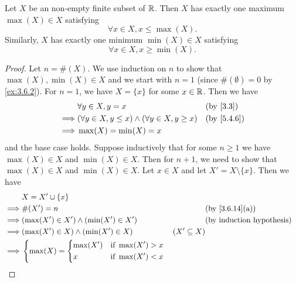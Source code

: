 \begin{ac}\label{ac:5.4.1}
  Let \(X\) be an non-empty finite subset of \(\mathbb{R}\).
  Then \(X\) has exactly one maximum \(\max(X) \in X\) satisfying
  \[
    \forall x \in X, x \leq \max(X).
  \]
  Similarly, \(X\) has exactly one minimum \(\min(X) \in X\) satisfying
  \[
    \forall x \in X, x \geq \min(X).
  \]
\end{ac}

\begin{proof}
  Let \(n = \#(X)\).
  We use induction on \(n\) to show that \(\max(X), \min(X) \in X\) and we start with \(n = 1\) (since \(\#(\emptyset) = 0\) by \cref{ex:3.6.2}).
  For \(n = 1\), we have \(X = \{x\}\) for some \(x \in \mathbb{R}\).
  Then we have
  \begin{align*}
             & \forall y \in X, y = x                                        &  & \text{(by \cref{3.3})} \\
    \implies & (\forall y \in X, y \leq x) \land (\forall y \in X, y \geq x) &  & \by{5.4.6}             \\
    \implies & \max(X) = \min(X) = x
  \end{align*}
  and the base case holds.
  Suppose inductively that for some \(n \geq 1\) we have \(\max(X) \in X\) and \(\min(X) \in X\).
  Then for \(n + 1\), we need to show that \(\max(X) \in X\) and \(\min(X) \in X\).
  Let \(x \in X\) and let \(X' = X \setminus \{x\}\).
  Then we have
  \begin{align*}
             & X = X' \cup \{x\}                                                                                                                           \\
    \implies & \#(X') = n                                                                                &                  & \text{(by \cref{3.6.14}(a))} \\
    \implies & (\max(X') \in X') \land (\min(X') \in X')                                                 &                  & \byIH                        \\
    \implies & (\max(X') \in X) \land (\min(X') \in X)                                                   & (X' \subseteq X)                                \\
    \implies & \begin{dcases}
                 \max(X) = \begin{dcases}
                  \max(X') & \text{if } \max(X') > x \\
                  x        & \text{if } \max(X') < x

\end{dcases}
\end{dcases}
\end{align*}
\end{proof}
